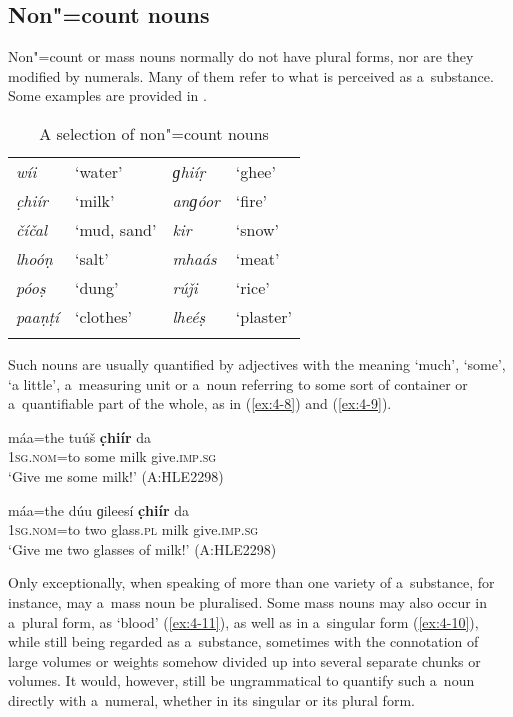 \subsection{Non"=count nouns}
\label{subsec:4-4-1}


Non"=count or mass nouns normally do not have plural forms, nor are they modified by numerals. Many of them refer to what is perceived as a~substance. Some examples are provided in .



\begin{table}[H]
\caption{A selection of non"=count nouns}
\begin{tabularx}{\textwidth}{ Q Q Q Q }
\lsptoprule
\textit{wíi} &
`water' &
\textit{ɡhiíṛ} &
`ghee'\\
\textit{c̣hiír} &
`milk' &
\textit{anɡóor} &
`fire'\\
\textit{číčal} &
`mud, sand' &
\textit{kir} &
`snow'\\
\textit{lhoóṇ} &
`salt' &
\textit{mhaás} &
`meat'\\
\textit{póoṣ} &
`dung' &
\textit{rúǰi} &
`rice'\\
\textit{paaṇṭí} &
`clothes' &
\textit{lheéṣ} &
`plaster'\\\lspbottomrule
\end{tabularx}
\label{tab:4-ncount}
\end{table}

Such nouns are usually quantified by adjectives with the meaning `much', `some', `a little', a~measuring unit or a~noun referring to some sort of container or a~quantifiable part of the whole, as in (\ref{ex:4-8}) and (\ref{ex:4-9}). 

\begin{exe}
\ex
\label{ex:4-8}
\gll máa=the tuúš \textbf{c̣hiír} da \\
	\textsc{1sg.nom}=to some milk give.\textsc{imp.sg} \\
\glt `Give me some milk!' (A:HLE2298)
\end{exe}

\begin{exe}
\ex
\label{ex:4-9}
\gll máa=the dúu ɡileesí \textbf{c̣hiír} da \\
	\textsc{1sg.nom}=to two glass.\textsc{pl} milk give.\textsc{imp.sg} \\
\glt `Give me two glasses of milk!' (A:HLE2298)
\end{exe}

Only exceptionally, when speaking of more than one variety of a~substance, for instance, may a~mass noun be pluralised. Some mass nouns may also occur in a~plural form, as `blood' (\ref{ex:4-11}), as well as in a~singular form (\ref{ex:4-10}), while still being regarded as a~substance, sometimes with the connotation of large volumes or weights somehow divided up into several separate chunks or volumes. It would, however, still be ungrammatical to quantify such a~noun directly with a~numeral, whether in its singular or its plural form.

